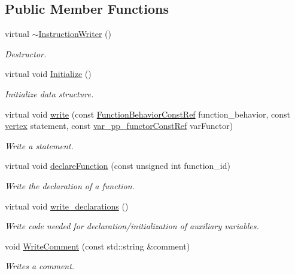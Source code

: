 \subsection*{Public Member Functions}
\begin{DoxyCompactItemize}
\item 
virtual \hyperlink{classInstructionWriter_a682e5e34912c1c5e7b90f872d8a37f2b}{$\sim$\+Instruction\+Writer} ()
\begin{DoxyCompactList}\small\item\em Destructor. \end{DoxyCompactList}\item 
virtual void \hyperlink{classInstructionWriter_ad194c685f8c1e718bc02c2c01cdd72d7}{Initialize} ()
\begin{DoxyCompactList}\small\item\em Initialize data structure. \end{DoxyCompactList}\item 
virtual void \hyperlink{classInstructionWriter_a94803a1043947086a0add73cb0b0213f}{write} (const \hyperlink{function__behavior_8hpp_a94872da12ed056b6ecf90456164e0213}{Function\+Behavior\+Const\+Ref} function\+\_\+behavior, const \hyperlink{graph_8hpp_abefdcf0544e601805af44eca032cca14}{vertex} statement, const \hyperlink{var__pp__functor_8hpp_a8a6b51b6519401d911398943510557f0}{var\+\_\+pp\+\_\+functor\+Const\+Ref} var\+Functor)
\begin{DoxyCompactList}\small\item\em Write a statement. \end{DoxyCompactList}\item 
virtual void \hyperlink{classInstructionWriter_adb886a6fe469c8b1142c63ee31c4a2f1}{declare\+Function} (const unsigned int function\+\_\+id)
\begin{DoxyCompactList}\small\item\em Write the declaration of a function. \end{DoxyCompactList}\item 
virtual void \hyperlink{classInstructionWriter_a94a8f1460fa6b3559ef14535feb0adab}{write\+\_\+declarations} ()
\begin{DoxyCompactList}\small\item\em Write code needed for declaration/initialization of auxiliary variables. \end{DoxyCompactList}\item 
void \hyperlink{classInstructionWriter_a4e01f8751745f83b25d91064377ad46b}{Write\+Comment} (const std\+::string \&comment)
\begin{DoxyCompactList}\small\item\em Writes a comment. \end{DoxyCompactList}\end{DoxyCompactItemize}
